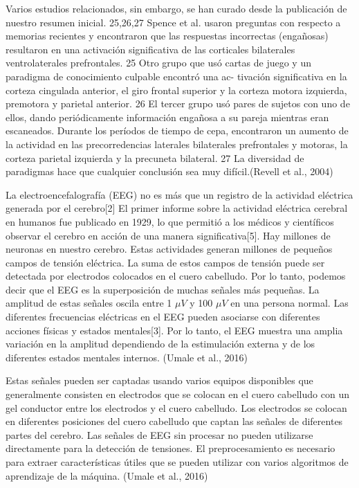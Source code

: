 Varios estudios relacionados, sin embargo, se han curado desde la publicación de nuestro resumen inicial. 25,26,27 Spence et al. usaron preguntas con respecto a memorias recientes y encontraron que las respuestas incorrectas (engañosas) resultaron en una activación significativa de las corticales bilaterales ventrolaterales prefrontales. 25 Otro grupo que usó cartas de juego y un paradigma de conocimiento culpable encontró una ac- tivación significativa en la corteza cingulada anterior, el giro frontal superior y la corteza motora izquierda, premotora y parietal anterior. 26 El tercer grupo usó pares de sujetos con uno de ellos, dando periódicamente información engañosa a su pareja mientras eran escaneados. Durante los períodos de tiempo de cepa, encontraron un aumento de la actividad en las precorredencias laterales bilaterales prefrontales y motoras, la corteza parietal izquierda y la precuneta bilateral. 27 La diversidad de paradigmas hace que cualquier conclusión sea muy difícil.(Revell et al., 2004)

La electroencefalografía (EEG) no es más que un registro de la actividad eléctrica generada por el cerebro[2] El primer informe sobre la actividad eléctrica cerebral en humanos fue publicado en 1929, lo que permitió a los médicos y científicos observar el cerebro en acción de una manera significativa[5]. Hay millones de neuronas en nuestro cerebro. Estas actividades generan millones de pequeños campos de tensión eléctrica.  La suma de estos campos de tensión puede ser detectada por electrodos colocados en el cuero cabelludo.  Por lo tanto, podemos decir que el EEG es la superposición de muchas señales más pequeñas.  La amplitud de estas señales oscila entre 1 $\mu V$ y 100 $\mu V$ en una persona normal. Las diferentes frecuencias eléctricas en el EEG pueden asociarse con diferentes acciones físicas y estados mentales[3]. Por lo tanto, el EEG muestra una amplia variación en la amplitud dependiendo de la estimulación externa y de los diferentes estados mentales internos. (Umale et al., 2016)

Estas señales pueden ser captadas usando varios equipos disponibles que generalmente consisten en electrodos que se colocan en el cuero cabelludo con un gel conductor entre los electrodos y el cuero cabelludo.  Los electrodos se colocan en diferentes posiciones del cuero cabelludo que captan las señales de diferentes partes del cerebro. Las señales de EEG sin procesar no pueden utilizarse directamente para la detección de tensiones. El preprocesamiento es necesario para extraer características útiles que se pueden utilizar con varios algoritmos de aprendizaje de la máquina. (Umale et al., 2016)

